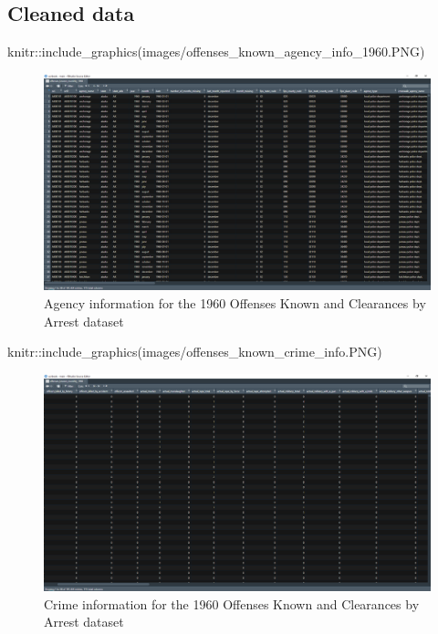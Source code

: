 \documentclass[
  12pt,
  openany]{book}
\newenvironment{Shaded}{\begin{snugshade}}{\end{snugshade}}
\newcommand{\FunctionTok}[1]{\textcolor[rgb]{0,0,0}{#1}}
\newcommand{\NormalTok}[1]{#1}
\newcommand{\SpecialCharTok}[1]{\textcolor[rgb]{0,0,0}{#1}}
\newcommand{\StringTok}[1]{\textcolor[rgb]{0.5,0.5,0.5}{#1}}
\begin{document}
\hypertarget{cleaned-data}{%
\subsection{Cleaned data}\label{cleaned-data}}

\begin{Shaded}
\begin{Highlighting}[]
\NormalTok{knitr}\SpecialCharTok{::}\FunctionTok{include\_graphics}\NormalTok{(}\StringTok{\textquotesingle{}images/offenses\_known\_agency\_info\_1960.PNG\textquotesingle{}}\NormalTok{)}
\end{Highlighting}
\end{Shaded}

\begin{figure}
\includegraphics[width=26.67in]{images/offenses_known_agency_info_1960} \caption{Agency information for the 1960 Offenses Known and Clearances by Arrest dataset}\label{fig:unnamed-chunk-2}
\end{figure}

\begin{Shaded}
\begin{Highlighting}[]
\NormalTok{knitr}\SpecialCharTok{::}\FunctionTok{include\_graphics}\NormalTok{(}\StringTok{\textquotesingle{}images/offenses\_known\_crime\_info.PNG\textquotesingle{}}\NormalTok{)}
\end{Highlighting}
\end{Shaded}

\begin{figure}
\includegraphics[width=26.62in]{images/offenses_known_crime_info} \caption{Crime information for the 1960 Offenses Known and Clearances by Arrest dataset}\label{fig:unnamed-chunk-3}
\end{figure}
\end{document}
